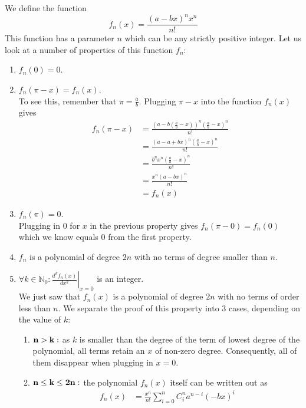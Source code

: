 \noindent We define the function
$$
f_n\left( x \right) = \frac{\left( a - b x \right)^n x^n }{n!} 
$$
This function has a parameter $n$ which can be any strictly positive integer. Let us look at a number of properties of this function $f_n$:
\begin{enumerate}
\item $f_n\left( 0 \right) = 0$.\\
\item \label{TitelProperty} $f_n \left( \pi-x \right) = f_n \left( x \right)$.\\
\noindent To see this, remember that $\pi = \frac{a}{b}$. Plugging $\pi - x$ into the function $f_n(x)$ gives
\begin{eqnarray*}
f_n \left( \pi - x \right) & = \frac{\left( a - b \left( \frac{a}{b}-x \right) \right)^n \left(\frac{a}{b} - x\right)^n}{n!} \\
 & = \frac{\left( a - a + bx \right)^n \left( \frac{a}{b}-x\right)^n}{n!}\\
 & = \frac{b^n x^n \left( \frac{a}{b}-x \right)^n}{n!} \\
& = \frac{x^n \left( a - bx \right)^n}{n!} \\
 & = f_n \left( x \right)
\end{eqnarray*}
\item $f_n \left(\pi \right) = 0$.\\
\noindent Plugging in $0$ for $x$ in the previous property gives $f_n(\pi - 0) = f_n(0)$ which we know equals $0$ from the first property.
\item $f_n$ is a polynomial of degree $2n$ with no terms of degree smaller than $n$.
\item $\forall k \in \mathbb{N}_0: \left.\frac{d^k f_n(x)}{dx^k}\right|_{x=0}$ is an integer.\\
\noindent We just saw that $f_n(x)$ is a polynomial of degree $2n$ with no terms of order less than $n$. We separate the proof of this property into 3 cases, depending on the value of $k$:
\begin{enumerate}[i]
\item $\bf{n > k:}$ as $k$ is smaller than the degree of the term of lowest degree of the polynomial, all terms retain an $x$ of non-zero degree. Consequently, all of them disappear when plugging in $x=0$.
\item $\bf{ n \leq k \leq 2n:}$ the polynomial $f_n(x)$ itself can be written out as
\begin{eqnarray*}
f_n(x) & = \frac{x^n}{n!} \sum\limits_{i=0}^{n} C^{n}_{i} a^{n-i}\left( -bx \right)^i \\

\end{eqnarray*}
\end{enumerate}
\end{enumerate}
